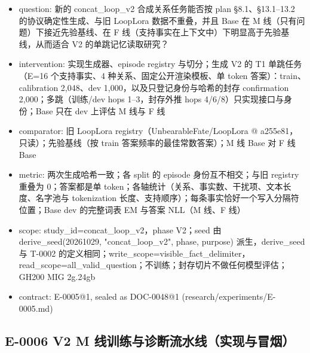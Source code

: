 \documentclass[11pt]{article}
\begin{document}
\begin{itemize}
\item question: 新的 concat\_loop\_v2 合成关系任务能否按 plan §8.1、§13.1--13.2 的协议确定性生成、与旧 LoopLora 数据不重叠，并且 Base 在 M 线（只有问题）下接近先验基线、在 F 线（支持事实在上下文中）下明显高于先验基线，从而适合 V2 的单跳记忆读取研究？
\item intervention: 实现生成器、episode registry 与切分；生成 V2 的 T1 单跳任务（E=16 个支持事实、4 种关系、固定公开渲染模板、单 token 答案）：train、calibration 2,048、dev 1,000，以及只登记身份与哈希的封存 confirmation 2,000；多跳（训练/dev hops 1--3，封存外推 hops 4/6/8）只实现接口与身份；Base 只在 dev 上评估 M 线与 F 线
\item comparator: 旧 LoopLora registry（UnbearableFate/LoopLora @ a255e81，只读）；先验基线（按 train 答案频率的最佳常数答案）；M 线 Base 对 F 线 Base
\item metric: 两次生成哈希一致；各 split 的 episode 身份互不相交；与旧 registry 重叠为 0；答案都是单 token；各轴统计（关系、事实数、干扰项、文本长度、名字池与 tokenization 长度、支持顺序）；每条事实恰好一个写入分隔符位置；Base dev 的完整词表 EM 与答案 NLL（M 线、F 线）
\item scope: study\_id=concat\_loop\_v2，phase V2；seed 由 derive\_seed(20261029, "concat\_loop\_v2", phase, purpose) 派生，derive\_seed 与 T-0002 的定义相同；write\_scope=visible\_fact\_delimiter，read\_scope=all\_valid\_question；不训练；封存切片不做任何模型评估；GH200 MIG 2g.24gb
\item contract: E-0005@1, sealed as DOC-0048@1 (research/experiments/E-0005.md)
\end{itemize}

\subsection*{E-0006 V2 M 线训练与诊断流水线（实现与冒烟）}
\end{document}
